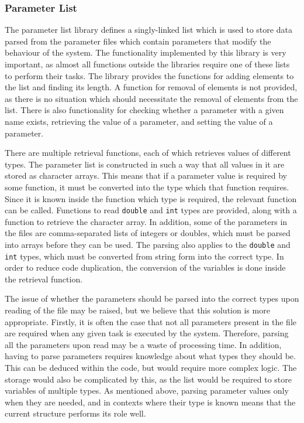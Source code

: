 \documentclass[a4paper,11pt]{article}
\begin{document}
\subsubsection{Parameter List}
\label{sec-3-3-1}

    The parameter list library defines a singly-linked list which is used to
    store data parsed from the parameter files which contain parameters that
    modify the behaviour of the system. The functionality implemented by this
    library is very important, as almost all functions outside the libraries
    require one of these lists to perform their tasks. The library provides the
    functions for adding elements to the list and finding its length. A function
    for removal of elements is not provided, as there is no situation which
    should necessitate the removal of elements from the list. There is also
    functionality for checking whether a parameter with a given name exists,
    retrieving the value of a parameter, and setting the value of a parameter.

    There are multiple retrieval functions, each of which retrieves values of
    different types. The parameter list is constructed in such a way that all
    values in it are stored as character arrays. This means that if a parameter
    value is required by some function, it must be converted into the type which
    that function requires. Since it is known inside the function which type is
    required, the relevant function can be called. Functions to read
    \texttt{double} and \texttt{int} types are provided, along with a function
    to retrieve the character array. In addition, some of the parameters in the
    files are comma-separated lists of integers or doubles, which must be parsed
    into arrays before they can be used. The parsing also applies to the
    \texttt{double} and \texttt{int} types, which must be converted from string
    form into the correct type. In order to reduce code duplication, the
    conversion of the variables is done inside the retrieval function.

    The issue of whether the parameters should be parsed into the correct types
    upon reading of the file may be raised, but we believe that this solution is
    more appropriate. Firstly, it is often the case that not all parameters
    present in the file are required when any given task is executed by the
    system. Therefore, parsing all the parameters upon read may be a waste of
    processing time. In addition, having to parse parameters requires knowledge
    about what types they should be. This can be deduced within the code, but
    would require more complex logic. The storage would also be complicated by
    this, as the list would be required to store variables of multiple types. As
    mentioned above, parsing parameter values only when they are needed, and in
    contexts where their type is known means that the current structure performs
    its role well.
\end{document}
